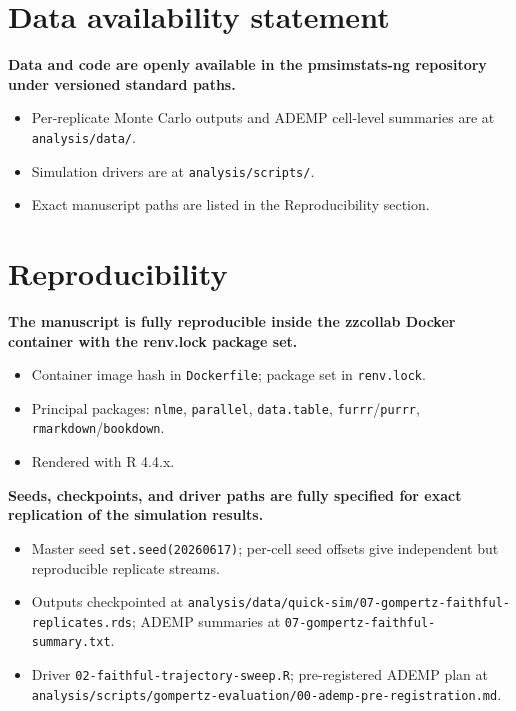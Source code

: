 \documentclass[
  11pt,
]{article}
\begin{document}
\section{Data availability statement}\label{data-availability-statement}

\textbf{Data and code are openly available in the
pmsimstats-ng repository under versioned standard paths.}

\begin{itemize}\setlength{\itemsep}{2pt}\setlength{\parskip}{0pt}
\item Per-replicate Monte Carlo outputs and ADEMP cell-level
  summaries are at \texttt{analysis/data/}.
\item Simulation drivers are at \texttt{analysis/scripts/}.
\item Exact manuscript paths are listed in the Reproducibility
  section.
\end{itemize}

\section{Reproducibility}\label{reproducibility}

\textbf{The manuscript is fully reproducible inside the
zzcollab Docker container with the renv.lock package set.}

\begin{itemize}\setlength{\itemsep}{2pt}\setlength{\parskip}{0pt}
\item Container image hash in \texttt{Dockerfile}; package
  set in \texttt{renv.lock}.
\item Principal packages: \texttt{nlme}, \texttt{parallel},
  \texttt{data.table}, \texttt{furrr}/\texttt{purrr},
  \texttt{rmarkdown}/\texttt{bookdown}.
\item Rendered with R 4.4.x.
\end{itemize}

\textbf{Seeds, checkpoints, and driver paths are fully
specified for exact replication of the simulation results.}

\begin{itemize}\setlength{\itemsep}{2pt}\setlength{\parskip}{0pt}
\item Master seed \texttt{set.seed(20260617)}; per-cell seed
  offsets give independent but reproducible replicate streams.
\item Outputs checkpointed at
  \texttt{analysis/data/quick-sim/07-gompertz-faithful-replicates.rds};
  ADEMP summaries at \texttt{07-gompertz-faithful-summary.txt}.
\item Driver \texttt{02-faithful-trajectory-sweep.R}; pre-registered
  ADEMP plan at
  \texttt{analysis/scripts/gompertz-evaluation/00-ademp-pre-registration.md}.
\end{itemize}
\end{document}
